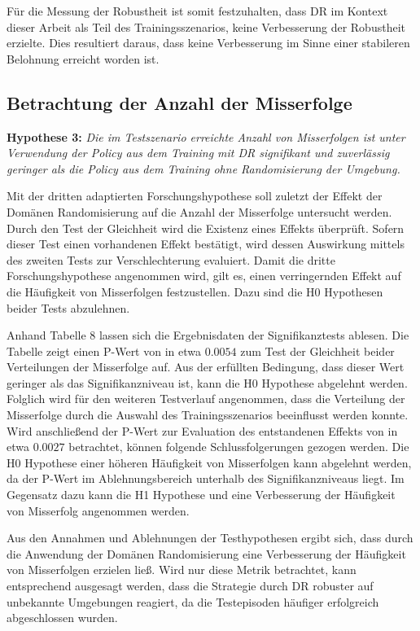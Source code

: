 Für die Messung der Robustheit ist somit festzuhalten, dass DR im Kontext dieser Arbeit als Teil des Trainingsszenarios, keine Verbesserung der Robustheit erzielte.
Dies resultiert daraus, dass keine Verbesserung im Sinne einer stabileren Belohnung erreicht worden ist.

\subsection{Betrachtung der Anzahl der Misserfolge}

\textbf{Hypothese 3:}
\textit{Die im Testszenario erreichte Anzahl von Misserfolgen ist unter Verwendung der Policy aus dem Training mit DR signifikant und zuverlässig geringer als die Policy aus dem Training ohne Randomisierung der Umgebung.}

Mit der dritten adaptierten Forschungshypothese soll zuletzt der Effekt der Domänen Randomisierung auf die Anzahl der Misserfolge untersucht werden.
Durch den Test der Gleichheit wird die Existenz eines Effekts überprüft.
Sofern dieser Test einen vorhandenen Effekt bestätigt, wird dessen Auswirkung mittels des zweiten Tests zur Verschlechterung evaluiert.
Damit die dritte Forschungshypothese angenommen wird, gilt es, einen verringernden Effekt auf die Häufigkeit von Misserfolgen festzustellen.
Dazu sind die H0 Hypothesen beider Tests abzulehnen.

Anhand Tabelle 8 lassen sich die Ergebnisdaten der Signifikanztests ablesen.
Die Tabelle zeigt einen P-Wert von in etwa $0.0054$ zum Test der Gleichheit beider Verteilungen der Misserfolge auf.
Aus der erfüllten Bedingung, dass dieser Wert geringer als das Signifikanzniveau ist, kann die H0 Hypothese abgelehnt werden.
Folglich wird für den weiteren Testverlauf angenommen, dass die Verteilung der Misserfolge durch die Auswahl des Trainingsszenarios beeinflusst werden konnte.
Wird anschließend der P-Wert zur Evaluation des entstandenen Effekts von in etwa $0.0027$ betrachtet, können folgende Schlussfolgerungen gezogen werden.
Die H0 Hypothese einer höheren Häufigkeit von Misserfolgen kann abgelehnt werden, da der P-Wert im Ablehnungsbereich unterhalb des Signifikanzniveaus liegt.
Im Gegensatz dazu kann die H1 Hypothese und eine Verbesserung der Häufigkeit von Misserfolg angenommen werden.

Aus den Annahmen und Ablehnungen der Testhypothesen ergibt sich, dass durch die Anwendung der Domänen Randomisierung eine Verbesserung der Häufigkeit von Misserfolgen erzielen ließ.
Wird nur diese Metrik betrachtet, kann entsprechend ausgesagt werden, dass die Strategie durch DR robuster auf unbekannte Umgebungen reagiert, da die Testepisoden häufiger erfolgreich abgeschlossen wurden.